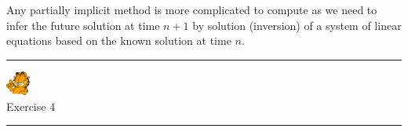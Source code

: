 Any partially implicit method is more complicated to compute as we need to infer the future solution 
at time $n+1$ by solution (inversion) of a system of linear equations based on the known solution at time $n$. 

\begin{center}

\end{center}


\begin{center}
\begin{minipage}[t]{0.77\textwidth}
\par\noindent\rule{\textwidth}{0.4pt}

\begin{center}
\includegraphics[width=0.8cm]{images/garftr} \\
{\color{orange}Exercise 4}
\end{center}

\par\noindent\rule{\textwidth}{0.4pt}
\end{minipage}
\end{center}





